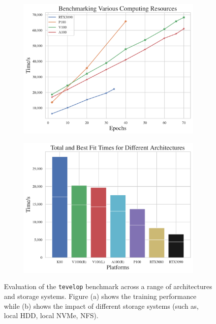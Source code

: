     \begin{figure}[!htb]
        \begin{subfigure}{0.49\textwidth}
        \centering
        \includegraphics[width=1.0\textwidth]{images/earthquake/eq-compare.pdf}
        \caption{}
        \label{fig:tevelop-runtimes}
        \end{subfigure}
        \hfill
        \begin{subfigure}{0.49\textwidth}
        \centering
        \includegraphics[width=1.0\textwidth]{images/earthquake/storage-performance.pdf}
        \caption{}
        \label{fig:tevelop-disk}
        \end{subfigure}
        \caption{Evaluation of the {\tt tevelop} benchmark across a range of architectures and storage systems.  Figure (a) shows the training performance while (b) shows the impact of different storage systems (such as, local HDD, local NVMe, NFS). }
        \label{fig:tevelop-architectures}
    \end{figure}
    

